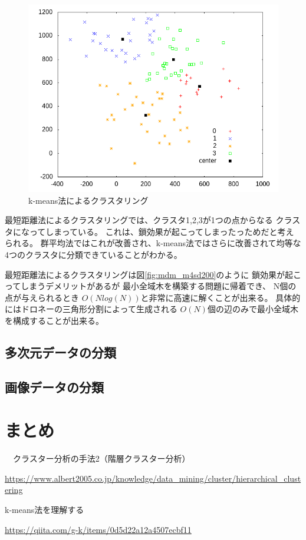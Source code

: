 \documentclass[dvipdfmx]{jsarticle}
\begin{document}
\begin{figure}[htbp]
  \centering
  \includegraphics[width=0.5\hsize]{./pic/k_means/m4sd200_plot.png}
  \caption{k-means法によるクラスタリング}
  \label{fig:km_m4sd200}
\end{figure}


最短距離法によるクラスタリングでは、クラスタ1,2,3が1つの点からなる
クラスタになってしまっている。
これは、鎖効果が起こってしまったっためだと考えられる。
群平均法ではこれが改善され、k-means法ではさらに改善されて均等な
4つのクラスタに分類できていることがわかる。

最短距離法によるクラスタリングは図\ref{fig:mdm_m4sd200}のように
鎖効果が起こってしまうデメリットがあるが
最小全域木を構築する問題に帰着でき、
N個の点が与えられるとき
$O(Nlog(N))$と非常に高速に解くことが出来る。
具体的にはドロネーの三角形分割によって生成される
$O(N)$個の辺のみで最小全域木を構成することが出来る。


\subsection{多次元データの分類}



\subsection{画像データの分類}


\section{まとめ}

\newpage
\begin{thebibliography}{10}
  　クラスター分析の手法2（階層クラスター分析）

  \url{https://www.albert2005.co.jp/knowledge/data_mining/cluster/hierarchical_clustering}

   k-means法を理解する

  \url{https://qiita.com/g-k/items/0d5d22a12a4507ecbf11}
\end{thebibliography}
\end{document}
